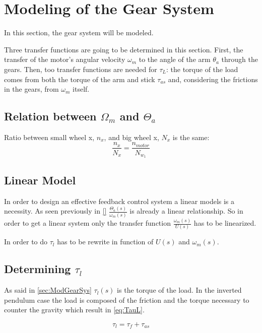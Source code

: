 \section{Modeling of the Gear System}\label{sec:ModGearSys}
In this section, the gear system will be modeled. 



Three transfer functions are going to be determined in this section. First, the transfer of the motor's angular velocity $\omega_m$ to the angle of the arm $\theta_a$ through the gears. Then, too transfer functions are needed for $\tau_L$: the torque of the load comes from both the torque of the arm and stick $\tau_{as}$ and, considering the frictions in the gears, from $\omega_m$ itself.


\subsection{Relation between $\Omega_m$ and $\Theta_a$}
Ratio between small wheel x, $n_x$, and big wheel x, $N_x$ is the same:
\begin{equation}
	\frac{n_x}{N_x} = \frac{n_{motor}}{N_{w_1}}
\end{equation}

\subsection{Linear Model}

In order to design an effective feedback control system a linear models is a necessity. As seen previously in \autoref{}  $\frac{\Theta_a(s)}{\omega_m(s)}$ is already a linear relationship. So in order to get a linear system only the transfer function $\frac{\omega_m(s)}{U(s)}$ has to be linearized.

In order to do $\tau_l$ has to be rewrite in function of $U(s)$ and $\omega_m(s)$.

\subsection{Determining $\tau_l$}
As said in \autoref{sec:ModGearSys} $\tau_l(s)$ is the torque of the load. In the inverted pendulum case the load is composed of the friction and the torque necessary to counter the gravity which result in \autoref{eq:TauL}.

\begin{equation}\label{eq:TauL}
	\tau_l = \tau_f + \tau_{as}
\end{equation}

